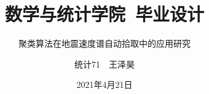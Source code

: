 



\usepackage{longtable}
\usepackage{newtxtext,newtxmath}
\usepackage[backend=biber,style=gb7714-2015, gbnamefmt=lowercase, 
maxcitenames=2,
mincitenames=1, 
gbcitelocal=gb7714-2015,
gbpub=false,
doi=false,
isbn=false,
url=false,
eprint=false]{biblatex}

\hypersetup{pdfpagemode=FullScreen}
\usepackage{ctex}
\setmainfont{Times New Roman}
\usepackage{graphicx}
\usepackage{amsmath}
\usepackage{amsfonts}
\usepackage{subfigure}
\usepackage{url}

\author{统计71~~王泽昊}

\date{2021年4月21日}

\title{数学与统计学院~毕业设计}
\subtitle[本科毕业设计]{聚类算法在地震速度谱自动拾取中的应用研究}

\graphicspath{{images/}}
